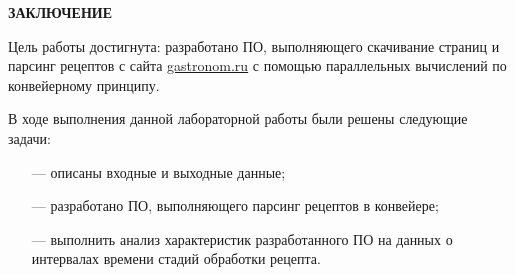 \begin{center}
    \textbf{ЗАКЛЮЧЕНИЕ}
\end{center}

Цель работы достигнута: разработано ПО, выполняющего скачивание страниц и парсинг рецептов с сайта \url{gastronom.ru} с помощью параллельных вычислений по конвейерному принципу.

\vspace{5mm}

В ходе выполнения данной лабораторной работы были решены следующие задачи:
\begin{itemize}
    \item[---] описаны входные и выходные данные;
    \item[---] разработано ПО, выполняющего парсинг рецептов в конвейере;
	\item[---] выполнить анализ характеристик разработанного ПО на данных о интервалах времени стадий обработки рецепта.
\end{itemize}